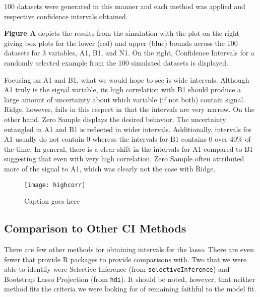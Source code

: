 100 datasets were generated in this manner and each method was applied and respective confidence intervals obtained.

\textbf{Figure A} depicts the results from the simulation with the plot on the right giving box plots for the lower (red) and upper (blue) bounds across the 100 datasets for 3 variables, A1, B1, and N1. On the right, Confidence Intervals for a randomly selected example from the 100 simulated datasets is displayed.

Focusing on A1 and B1, what we would hope to see is wide intervals. Although A1 truly is the signal variable, its high correlation with B1 should produce a large amount of uncertainty about which variable (if not both) contain signal. Ridge, however, fails in this respect in that the intervals are very narrow. On the other hand, Zero Sample displays the desired behavior. The uncertainty entangled in A1 and B1 is reflected in wider intervals. Additionally, intervals for A1 usually do not contain 0 whereas the intervals for B1 contains 0 over 40\% of the time. In general, there is a clear shift in the intervals for A1 compared to B1 suggesting that even with very high correlation, Zero Sample often attributed more of the signal to A1, which was clearly not the case with Ridge.

\begin{figure}[hbtp]
  \texttt{[image: highcorr]}
  \caption{\label{Fig:highcorr} Caption goes here}
\end{figure}


\subsection{Comparison to Other CI Methods}


There are few other methods for obtaining intervals for the lasso. There are even fewer that provide R packages to provide comparisons with. Two that we were able to identify were Selective Inference (from \texttt{selectiveInference}) and Bootstrap Lasso Projection (from \texttt{hdi}). It should be noted, however, that neither method fits the criteria we were looking for of remaining faithful to the model fit.

